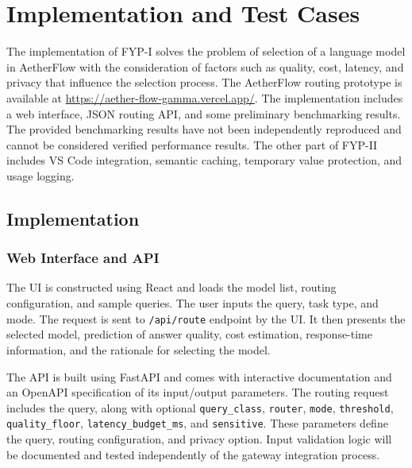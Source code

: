 \chapter{Implementation and Test Cases}
\label{ch:implementation}
The implementation of FYP-I solves the problem of selection of a language model in AetherFlow with the consideration of factors such as quality, cost, latency, and privacy that influence the selection process. The AetherFlow routing prototype is available at \url{https://aether-flow-gamma.vercel.app/}. The implementation includes a web interface, JSON routing API, and some preliminary benchmarking results. The provided benchmarking results have not been independently reproduced and cannot be considered verified performance results. The other part of FYP-II includes VS Code integration, semantic caching, temporary value protection, and usage logging.

\section{Implementation}

\subsection{Web Interface and API}
The UI is constructed using React and loads the model list, routing configuration, and sample queries. The user inputs the query, task type, and mode. The request is sent to \texttt{/api/route} endpoint by the UI. It then presents the selected model, prediction of answer quality, cost estimation, response-time information, and the rationale for selecting the model.

The API is built using FastAPI and comes with interactive documentation and an OpenAPI specification of its input/output parameters. The routing request includes the query, along with optional \texttt{query\_class}, \texttt{router}, \texttt{mode}, \texttt{threshold}, \texttt{quality\_floor}, \texttt{latency\_budget\_ms}, and \texttt{sensitive}. These parameters define the query, routing configuration, and privacy option. Input validation logic will be documented and tested independently of the gateway integration process.

